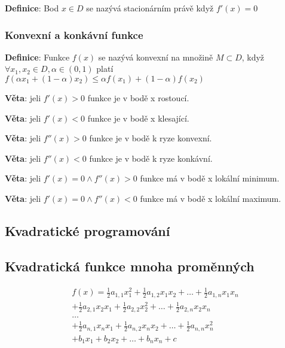 \documentclass[12pt, letterpaper, twoside]{article}
\begin{document}
\textbf{Definice}: Bod $x \in D$ se nazývá stacionárním právě když $f'(x) = 0$

\subsubsection{Konvexní a konkávní funkce}

\textbf{Definice}: Funkce $f(x)$ se nazývá konvexní na množině $M \subset D$, když $\forall x_{1},x_{2} \in D, \alpha \in (0,1)$ platí
\begin{math}
    f(\alpha x_{1} + (1-\alpha)x_{2}) \le \alpha f(x_{1}) + (1-\alpha)f(x_{2})
\end{math}

\textbf{Věta}: jeli $f'(x) > 0$ funkce je v bodě x rostoucí.

\textbf{Věta}: jeli $f'(x) < 0$ funkce je v bodě x klesající.

\textbf{Věta}: jeli $f''(x) > 0$ funkce je v bodě k ryze konvexní.

\textbf{Věta}: jeli $f''(x) < 0$ funkce je v bodě k ryze konkávní.

\textbf{Věta}: jeli $f'(x) = 0 \wedge f''(x) > 0$ funkce má v bodě x lokální minimum.

\textbf{Věta}: jeli $f'(x) = 0 \wedge f''(x) < 0$ funkce má v bodě x lokální maximum.

\subsection{Kvadratické programování}

\subsection{Kvadratická funkce mnoha proměnných}

\begin{multline}
    f(x) = \frac{1}{2} a_{1,1}x_{1}^{2} + \frac{1}{2} a_{1,2}x_{1}x_{2} + \dots + \frac{1}{2} a_{1,n}x_{1}x_{n} \\
    + \frac{1}{2} a_{2,1}x_{2}x_{1} + \frac{1}{2} a_{2,2}x_{2}^{2} + \dots + \frac{1}{2} a_{2,n}x_{2}x_{n} \\
    \dots \\
    + \frac{1}{2} a_{n,1}x_{n}x_{1} + \frac{1}{2} a_{n,2}x_{n}x_{2} + \dots + \frac{1}{2} a_{n,n}x_{n}^{2} \\
    + b_{1}x_{1} + b_{2}x_{2} + \dots + b_{n}x_{n} + c
\end{multline}
\end{document}
